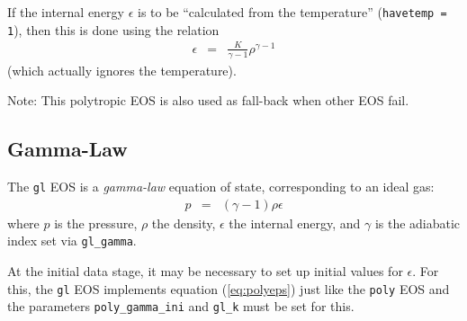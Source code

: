 If the internal energy $\epsilon$ is to be ``calculated from the
temperature'' (\texttt{havetemp = 1}), then this is done using the
relation
\begin{eqnarray}
  \epsilon & = & \frac{K}{\gamma-1} \rho^{\gamma-1}
\label{eq:polyeps}
\end{eqnarray}
(which actually ignores the temperature).

Note: This polytropic EOS is also used as fall-back when other
EOS fail.

\subsection{Gamma-Law}

The \texttt{gl} EOS is a \emph{gamma-law} equation of state,
corresponding to an ideal gas:
\begin{eqnarray}
  p & = & (\gamma-1) \rho \epsilon
\end{eqnarray}
where $p$ is the pressure, $\rho$ the density, $\epsilon$ the internal
energy, and $\gamma$ is the adiabatic index set via
\texttt{gl\_gamma}.

At the initial data stage, it may be necessary to set up initial
values for $\epsilon$. For this, the \texttt{gl} EOS 
implements equation (\ref{eq:polyeps}) just like the \texttt{poly}
EOS and the parameters \texttt{poly\_gamma\_ini} and 
\texttt{gl\_k} must be set for this.




